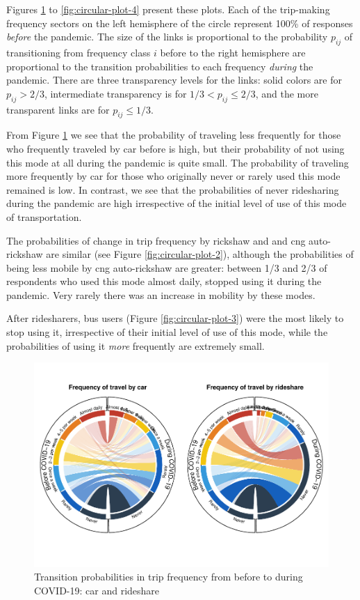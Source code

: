 \documentclass[]{elsarticle} %
\begin{document}
Figures \ref{fig:circular-plot-1} to \ref{fig:circular-plot-4} present
these plots. Each of the trip-making frequency sectors on the left
hemisphere of the circle represent 100\% of responses \emph{before} the
pandemic. The size of the links is proportional to the probability
\(p_{ij}\) of transitioning from frequency class \(i\) before to the
right hemisphere are proportional to the transition probabilities to
each frequency \emph{during} the pandemic. There are three transparency
levels for the links: solid colors are for \(p_{ij}>2/3\), intermediate
transparency is for \(1/3 < p_{ij} \le 2/3\), and the more transparent
links are for \(p_{ij}\le 1/3\).

From Figure \ref{fig:circular-plot-1} we see that the probability of
traveling less frequently for those who frequently traveled by car
before is high, but their probability of not using this mode at all
during the pandemic is quite small. The probability of traveling more
frequently by car for those who originally never or rarely used this
mode remained is low. In contrast, we see that the probabilities of
never ridesharing during the pandemic are high irrespective of the
initial level of use of this mode of transportation.

The probabilities of change in trip frequency by rickshaw and and cng
auto-rickshaw are similar (see Figure \ref{fig:circular-plot-2}),
although the probabilities of being less mobile by cng auto-rickshaw are
greater: between 1/3 and 2/3 of respondents who used this mode almost
daily, stopped using it during the pandemic. Very rarely there was an
increase in mobility by these modes.

After ridesharers, bus users (Figure \ref{fig:circular-plot-3}) were the
most likely to stop using it, irrespective of their initial level of use
of this mode, while the probabilities of using it \emph{more} frequently
are extremely small.

\begin{figure}
\centering
\includegraphics{Frequency-of-Travel-by-Mode-COVID-19-Bangladesh_files/figure-latex/circular-plots-transition-probabilities-1-1.pdf}
\caption{\label{fig:circular-plot-1}Transition probabilities in trip
frequency from before to during COVID-19: car and rideshare}
\end{figure}
\end{document}
